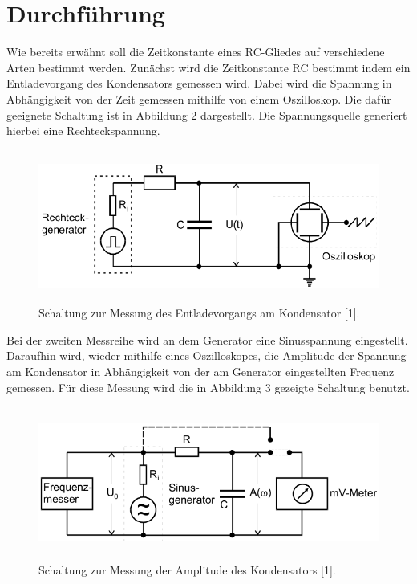 \section{Durchführung}

Wie bereits erwähnt soll die Zeitkonstante eines RC-Gliedes auf verschiedene Arten bestimmt werden.
Zunächst wird die Zeitkonstante RC bestimmt indem ein Entladevorgang des Kondensators gemessen
wird. Dabei wird die Spannung in Abhängigkeit von der Zeit gemessen mithilfe von einem
Oszilloskop. Die dafür geeignete Schaltung ist in Abbildung 2 dargestellt. Die Spannungsquelle
generiert hierbei eine Rechteckspannung.

\begin{figure}[H]
  \centering
  \includegraphics[height=5cm, width=\textwidth]{D1.png}
  \caption{Schaltung zur Messung des Entladevorgangs am Kondensator [1].}
\end{figure}

Bei der zweiten Messreihe wird an dem Generator eine Sinusspannung eingestellt.
Daraufhin wird, wieder mithilfe eines Oszilloskopes, die Amplitude der Spannung am
Kondensator in Abhängigkeit von der am Generator eingestellten Frequenz gemessen.
Für diese Messung wird die in Abbildung 3 gezeigte Schaltung benutzt.

\begin{figure}[H]
  \centering
  \includegraphics[height=5cm, width=\textwidth]{D2.png}
  \caption{Schaltung zur Messung der Amplitude des Kondensators [1].}
\end{figure}

